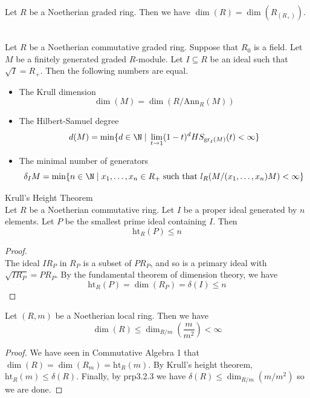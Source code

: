 \documentclass[a4paper]{article}
\begin{document}
\begin{lmm}{}{}\\
Let $R$ be a Noetherian graded ring. Then we have $\dim(R)=\dim(R_{(R_+)})$. 
\end{lmm}

\begin{prp}{}{}\\
Let $R$ be a Noetherian commutative graded ring. Suppose that $R_0$ is a field. Let $M$ be a finitely generated graded $R$-module. Let $I\subseteq R$ be an ideal such that $\sqrt{I}=R_+$. Then the following numbers are equal. 
\begin{itemize}
\item The Krull dimension $$\dim(M)=\dim(R/\text{Ann}_R(M))$$
\item The Hilbert-Samuel degree $$d(M)=\min\{d\in\N\;|\;\lim_{t\to 1}(1-t)^dHS_{\text{gr}_I(M)}(t)<\infty\}$$
\item The minimal number of generators $$\delta_IM=\min\{n\in\N\;|\;x_1,\dots,x_n\in R_+\text{ such that }l_R(M/(x_1,\dots,x_n)M)<\infty\}$$
\end{itemize}
\end{prp}

\begin{thm}{Krull's Height Theorem}{}\\
Let $R$ be a Noetherian commutative ring. Let $I$ be a proper ideal generated by $n$ elements. Let $P$ be the smallest prime ideal containing $I$. Then $$\text{ht}_R(P)\leq n$$
\begin{proof}\\
The ideal $IR_P$ in $R_P$ is a subset of $PR_P$, and so is a primary ideal with $\sqrt{IR_P}=PR_P$. By the fundamental theorem of dimension theory, we have $$\text{ht}_R(P)=\dim(R_P)=\delta(I)\leq n$$
\end{proof}
\end{thm}

\begin{prp}{}{} Let $(R,m)$ be a Noetherian local ring. Then we have $$\dim(R)\leq\dim_{R/m}\left(\frac{m}{m^2}\right)<\infty$$ 
\begin{proof}
We have seen in Commutative Algebra 1 that $\dim(R)=\dim(R_m)=\text{ht}_R(m)$. By Krull's height theorem, $\text{ht}_R(m)\leq\delta(R)$. Finally, by prp3.2.3 we have $\delta(R)\leq\dim_{R/m}(m/m^2)$ so we are done. 
\end{proof}
\end{prp}
\end{document}
